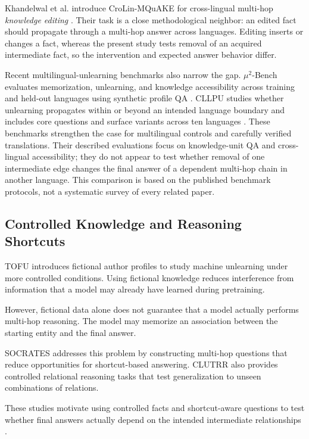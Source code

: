 \documentclass[10pt,a4paper]{article}
\begin{document}
Khandelwal et al. introduce CroLin-MQuAKE for
cross-lingual multi-hop \emph{knowledge editing}
\cite{khandelwal2024crosslingual}. Their task is a close
methodological neighbor: an edited fact should propagate
through a multi-hop answer across languages. Editing
inserts or changes a fact, whereas the present study
tests removal of an acquired intermediate fact, so the
intervention and expected answer behavior differ.

Recent multilingual-unlearning benchmarks also narrow
the gap. $\mu^2$-Bench evaluates memorization,
unlearning, and knowledge accessibility across training
and held-out languages using synthetic profile QA
\cite{hwang2026mu2bench}. CLLPU studies whether
unlearning propagates within or beyond an intended
language boundary and includes core questions and
surface variants across ten languages
\cite{shao2026cllpu}. These benchmarks strengthen the
case for multilingual controls and carefully verified
translations. Their described evaluations focus on
knowledge-unit QA and cross-lingual accessibility; they
do not appear to test whether removal of one intermediate
edge changes the final answer of a dependent multi-hop
chain in another language. This comparison is based on
the published benchmark protocols, not a systematic
survey of every related paper.

\subsection{Controlled Knowledge and Reasoning Shortcuts}

TOFU \cite{maini2024tofu} introduces fictional author profiles to study machine unlearning under more controlled conditions. Using fictional knowledge reduces interference from information that a model may already have learned during pretraining.

However, fictional data alone does not guarantee that a model actually performs multi-hop reasoning. The model may memorize an association between the starting entity and the final answer.

SOCRATES \cite{yang2025socrates} addresses this problem by constructing multi-hop questions that reduce opportunities for shortcut-based answering. CLUTRR \cite{sinha2019clutrr} also provides controlled relational reasoning tasks that test generalization to unseen combinations of relations.

These studies motivate using controlled facts and shortcut-aware questions to test whether final answers actually depend on the intended intermediate relationships \cite{yang2025socrates,sinha2019clutrr}.
\end{document}
